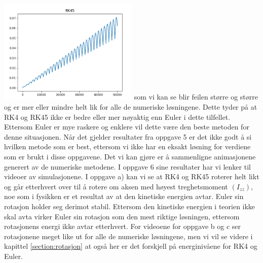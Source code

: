 \includegraphics[width=0.5\textwidth]{rapport/bilder/RK45.png} \newline \newline
som vi kan se blir feilen større og større og er mer eller mindre helt lik for alle de numeriske løsningene. Dette tyder på at RK4 og RK45 ikke er bedre eller mer nøyaktig enn Euler i dette tilfellet. Ettersom Euler er mye raskere og enklere vil dette være den beste metoden for denne situasjonen. Når det gjelder resultater fra oppgave 5 er det ikke godt å si hvilken metode som er best, ettersom vi ikke har en eksakt løsning for verdiene som er brukt i disse oppgavene. Det vi kan gjøre er å sammenligne animasjonene generert av de numeriske metodene.\newline \newline
I oppgave 6 sine resultater har vi lenker til videoer av simulasjonene. I oppgave a) kan vi se at RK4 og RK45 roterer helt likt og går etterhvert over til å rotere om aksen med høyest treghetsmoment $(I_{zz})$, noe som i fysikken er et resultat av at den kinetiske energien avtar. Euler sin rotasjon holder seg derimot stabil. Ettersom den kinetiske energien i teorien ikke skal avta virker Euler sin rotasjon som den mest riktige løsningen, ettersom rotasjonens energi ikke avtar etterhvert. For videoene for oppgave b og c ser rotasjonene meget like ut for alle de numeriske løsningene, men vi vil se videre i kapittel \ref{section:rotasjon} at også her er det forskjell på energinivåene for RK4 og Euler.

